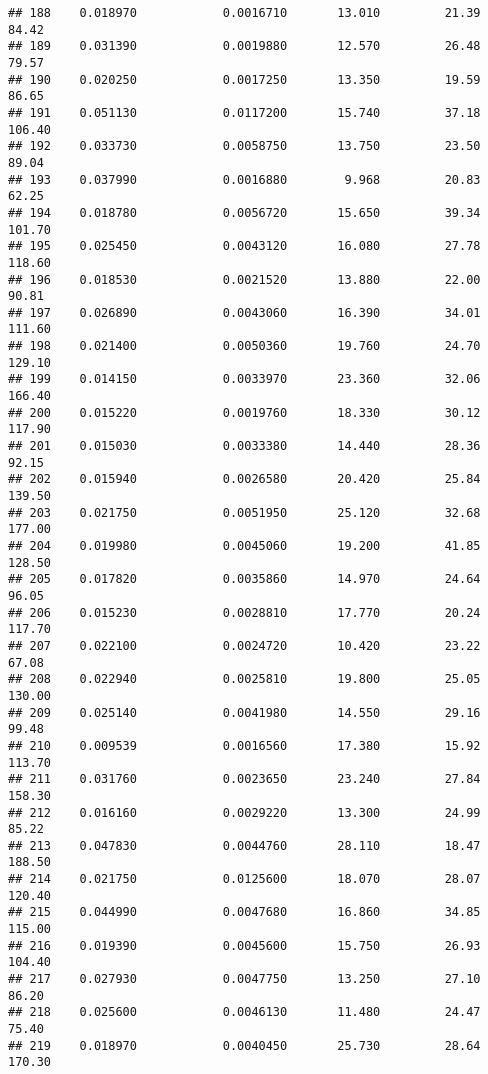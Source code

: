 \documentclass[
]{article}
\begin{document}
\begin{verbatim}
## 188    0.018970            0.0016710       13.010         21.39           84.42
## 189    0.031390            0.0019880       12.570         26.48           79.57
## 190    0.020250            0.0017250       13.350         19.59           86.65
## 191    0.051130            0.0117200       15.740         37.18          106.40
## 192    0.033730            0.0058750       13.750         23.50           89.04
## 193    0.037990            0.0016880        9.968         20.83           62.25
## 194    0.018780            0.0056720       15.650         39.34          101.70
## 195    0.025450            0.0043120       16.080         27.78          118.60
## 196    0.018530            0.0021520       13.880         22.00           90.81
## 197    0.026890            0.0043060       16.390         34.01          111.60
## 198    0.021400            0.0050360       19.760         24.70          129.10
## 199    0.014150            0.0033970       23.360         32.06          166.40
## 200    0.015220            0.0019760       18.330         30.12          117.90
## 201    0.015030            0.0033380       14.440         28.36           92.15
## 202    0.015940            0.0026580       20.420         25.84          139.50
## 203    0.021750            0.0051950       25.120         32.68          177.00
## 204    0.019980            0.0045060       19.200         41.85          128.50
## 205    0.017820            0.0035860       14.970         24.64           96.05
## 206    0.015230            0.0028810       17.770         20.24          117.70
## 207    0.022100            0.0024720       10.420         23.22           67.08
## 208    0.022940            0.0025810       19.800         25.05          130.00
## 209    0.025140            0.0041980       14.550         29.16           99.48
## 210    0.009539            0.0016560       17.380         15.92          113.70
## 211    0.031760            0.0023650       23.240         27.84          158.30
## 212    0.016160            0.0029220       13.300         24.99           85.22
## 213    0.047830            0.0044760       28.110         18.47          188.50
## 214    0.021750            0.0125600       18.070         28.07          120.40
## 215    0.044990            0.0047680       16.860         34.85          115.00
## 216    0.019390            0.0045600       15.750         26.93          104.40
## 217    0.027930            0.0047750       13.250         27.10           86.20
## 218    0.025600            0.0046130       11.480         24.47           75.40
## 219    0.018970            0.0040450       25.730         28.64          170.30

\end{verbatim}
\end{document}
